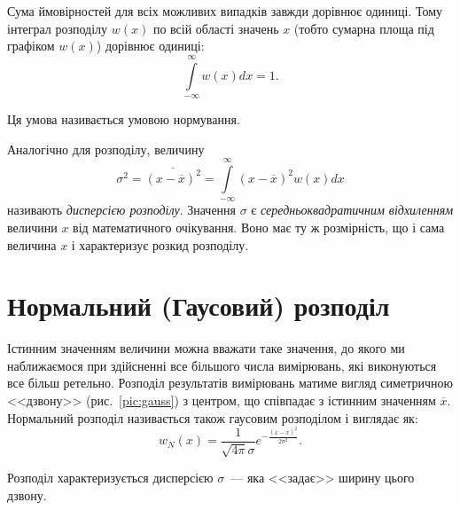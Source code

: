 \documentclass{LabBook}
\begin{document}
Сума ймовірностей для всіх можливих випадків завжди дорівнює одиниці. Тому інтеграл розподілу $w(x)$ по всій області значень $x$ (тобто сумарна площа під графіком $w(x)$) дорівнює одиниці:
\begin{equation}\label{eq:prob}
	\int\limits_{-\infty}^{\infty} w(x) dx = 1.
\end{equation}

Ця умова називається умовою нормування.

Аналогічно для розподілу, величину
\begin{equation}\label{eq:sigma}
	\sigma^2 = \overline{(x - \overline{x})^2} = \int\limits_{-\infty}^{\infty} (x - \overline{x})^2 w(x) dx
\end{equation}
називають \emph{дисперсією розподілу}. Значення $\sigma$ є \emph{середньоквадратичним відхиленням} величини $x$ від математичного очікування. Воно має ту ж розмірність, що і сама величина $x$ і характеризує розкид розподілу.


\section{Нормальний (Гаусовий) розподіл}


Істинним значенням величини можна вважати таке значення, до якого ми наближаємося при здійсненні все більшого числа вимірювань, які виконуються все більш ретельно. Розподіл результатів вимірювань матиме вигляд симетричною <<дзвону>>  (рис.~\ref{pic:gauss})
з центром, що співпадає з істинним значенням $\overline{x}$. Нормальний розподіл називається також гаусовим розподілом і виглядає як:
\begin{equation}\label{eq:normal}
	w_N(x) = \frac{1}{\sqrt{4\pi}\sigma} e^{- \frac{(x - \overline{x})^2}{2\sigma^2}}.
\end{equation}

Розподіл характеризується дисперсією $\sigma$~--- яка <<задає>> ширину цього дзвону.
\end{document}
